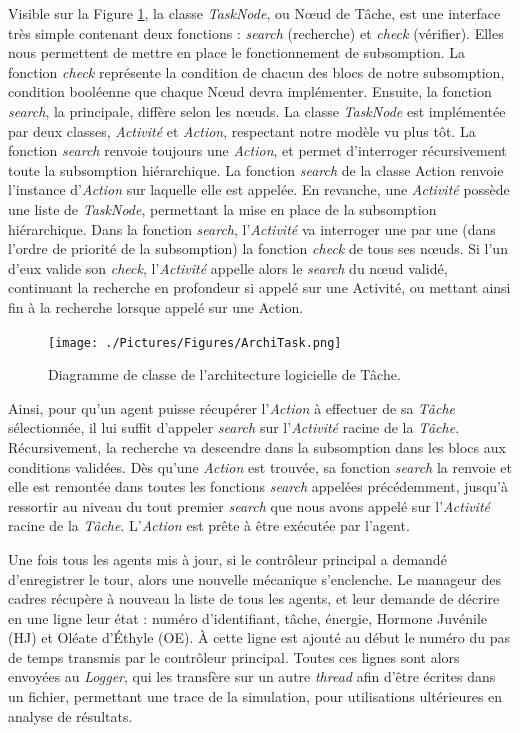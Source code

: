 			Visible sur la Figure \ref{ArchiTask}, la classe \textit{TaskNode}, ou Nœud de Tâche, est une interface très simple contenant deux fonctions : \textit{search} (recherche) et \textit{check} (vérifier). Elles nous permettent de mettre en place le fonctionnement de subsomption. La fonction \textit{check} représente la condition de chacun des blocs de notre subsomption, condition booléenne que chaque Nœud devra implémenter. Ensuite, la fonction \textit{search}, la principale, diffère selon les nœuds. La classe \textit{TaskNode} est implémentée par deux classes, \textit{Activité} et \textit{Action}, respectant notre modèle vu plus tôt. La fonction \textit{search} renvoie toujours une \textit{Action}, et permet d'interroger récursivement toute la subsomption hiérarchique. La fonction \textit{search} de la classe Action renvoie l'instance d'\textit{Action} sur laquelle elle est appelée. En revanche, une \textit{Activité} possède une liste de \textit{TaskNode}, permettant la mise en place de la subsomption hiérarchique. Dans la fonction \textit{search}, l'\textit{Activité} va interroger une par une (dans l'ordre de priorité de la subsomption) la fonction \textit{check} de tous ses nœuds. Si l'un d'eux valide son \textit{check}, l'\textit{Activité} appelle alors le \textit{search} du nœud validé, continuant la recherche en profondeur si appelé sur une Activité, ou mettant ainsi fin à la recherche lorsque appelé sur une Action.
			
			\begin{figure}
			\centering
			\texttt{[image: ./Pictures/Figures/ArchiTask.png]}
			\caption{Diagramme de classe de l'architecture logicielle de Tâche.}
			\label{ArchiTask}
			\end{figure}
			
			Ainsi, pour qu'un agent puisse récupérer l'\textit{Action} à effectuer de sa \textit{Tâche} sélectionnée, il lui suffit d'appeler \textit{search} sur l'\textit{Activité} racine de la \textit{Tâche}. Récursivement, la recherche va descendre dans la subsomption dans les blocs aux conditions validées. Dès qu'une \textit{Action} est trouvée, sa fonction \textit{search} la renvoie et elle est remontée dans toutes les fonctions \textit{search} appelées précédemment, jusqu'à ressortir au niveau du tout premier \textit{search} que nous avons appelé sur l'\textit{Activité} racine de la \textit{Tâche}. L'\textit{Action} est prête à être exécutée par l'agent.
			
			
			Une fois tous les agents mis à jour, si le contrôleur principal a demandé d'enregistrer le tour, alors une nouvelle mécanique s'enclenche. Le manageur des cadres récupère à nouveau la liste de tous les agents, et leur demande de décrire en une ligne leur état : numéro d'identifiant, tâche, énergie, Hormone Juvénile (HJ) et Oléate d'Éthyle (OE). À cette ligne est ajouté au début le numéro du pas de temps transmis par le contrôleur principal. Toutes ces lignes sont alors envoyées au \textit{Logger}, qui les transfère sur un autre \textit{thread} afin d'être écrites dans un fichier, permettant une trace de la simulation, pour utilisations ultérieures en analyse de résultats.
			
